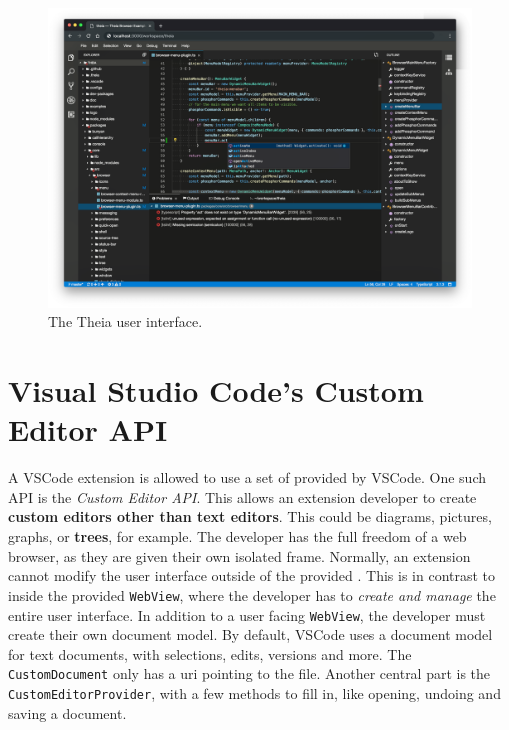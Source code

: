 \begin{figure}[htbp]  %
  \centering
  \includegraphics[width=\textwidth]{figures/pre-project/theia-screenshot.png}
  \caption[Theia User Interface]{The \gls{Theia} user interface.}\label{fig:theia-ui}
\end{figure}

\section{Visual Studio Code's Custom Editor API}\label{sec:vscode-custom-editor}

A \gls{VSCode} extension is allowed to use a set of  provided by \gls{VSCode}.
One such \acrshort{API} is the \textit{Custom Editor API}.
This allows an extension developer to create \textbf{custom editors other than text editors}.
This could be diagrams, pictures, graphs, or \textbf{trees}, for example.
The developer has the full freedom of a web browser, as they are given their own isolated frame.
Normally, an extension cannot modify the user interface outside of the provided .
This is in contrast to inside the provided \texttt{WebView}, where the developer has to \textit{create and manage} the entire user interface.
In addition to a user facing \texttt{WebView}, the developer must create their own document model.
By default, \gls{VSCode} uses a document model for text documents, with selections, edits, versions and more.
The \texttt{CustomDocument} only has a uri pointing to the file.
Another central part is the \texttt{CustomEditorProvider}, with a few methods to fill in, like opening, undoing and saving a document.


